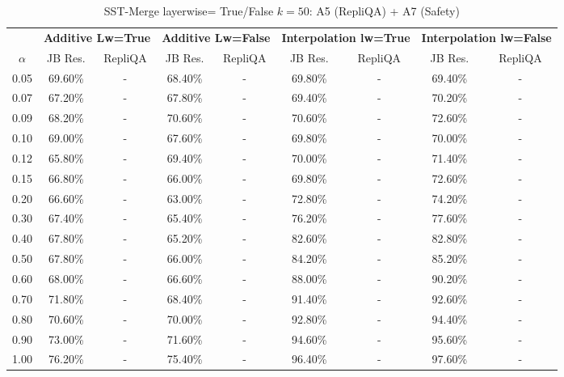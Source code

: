 \begin{table}[h]
\centering
\caption{SST-Merge layerwise= True/False $k=50$: A5 (RepliQA) + A7 (Safety)}
\label{tab:res_a5_a7_sst_50}
\begin{tabular}{c|cc|cc|cc|cc}
\hline
 & \multicolumn{2}{c|}{\textbf{Additive Lw=True}} & \multicolumn{2}{c|}{\textbf{Additive Lw=False}} & \multicolumn{2}{c|}{\textbf{Interpolation lw=True}}& \multicolumn{2}{c}{\textbf{Interpolation lw=False}} \\
$\alpha$ & JB Res. & RepliQA & JB Res. & RepliQA & JB Res. & RepliQA & JB Res. & RepliQA \\
\hline
0.05 & 69.60\% & - & 68.40\% & - & 69.80\% & - & 69.40\% & - \\
0.07 & 67.20\% & - & 67.80\% & - & 69.40\% & - & 70.20\% & - \\
0.09 & 68.20\% & - & 70.60\% & - & 70.60\% & - & 72.60\% & - \\
0.10 & 69.00\% & - & 67.60\% & - & 69.80\% & - & 70.00\% & - \\
0.12 & 65.80\% & - & 69.40\% & - & 70.00\% & - & 71.40\% & - \\
0.15 & 66.80\% & - & 66.00\% & - & 69.80\% & - & 72.60\% & - \\
0.20 & 66.60\% & - & 63.00\% & - & 72.80\% & - & 74.20\% & - \\
0.30 & 67.40\% & - & 65.40\% & - & 76.20\% & - & 77.60\% & - \\
0.40 & 67.80\% & - & 65.20\% & - & 82.60\% & - & 82.80\% & - \\
0.50 & 67.80\% & - & 66.00\% & - & 84.20\% & - & 85.20\% & - \\
0.60 & 68.00\% & - & 66.60\% & - & 88.00\% & - & 90.20\% & - \\
0.70 & 71.80\% & - & 68.40\% & - & 91.40\% & - & 92.60\% & - \\
0.80 & 70.60\% & - & 70.00\% & - & 92.80\% & - & 94.40\% & - \\
0.90 & 73.00\% & - & 71.60\% & - & 94.60\% & - & 95.60\% & - \\
1.00 & 76.20\% & - & 75.40\% & - & 96.40\% & - & 97.60\% & - \\
\hline
\end{tabular}
\end{table}
\FloatBarrier

